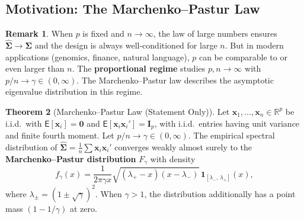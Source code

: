 \documentclass[12pt,a4paper]{article}
\theoremstyle{definition}
\newtheorem{theorem}{Theorem}[section]
\newtheorem{remark}[theorem]{Remark}
\newcommand\expc{\mathsf{E}}
\newcommand{\bx}{\mathbf{x}}
\newcommand{\bI}{\mathbf{I}}
\newcommand{\bzero}{\mathbf{0}}
\newcommand{\Real}{\mathbb{R}}
\newcommand{\bSigma}{\boldsymbol{\Sigma}}
\newcommand{\hbSigma}{\hat{\boldsymbol{\Sigma}}}
\begin{document}
\subsection{Motivation: The Marchenko--Pastur Law}

\begin{remark}
When $p$ is fixed and $n \to \infty$, the law of large numbers ensures $\hbSigma \to \bSigma$ and the design is always well-conditioned for large $n$. But in modern applications (genomics, finance, natural language), $p$ can be comparable to or even larger than $n$. The \textbf{proportional regime} studies $p, n \to \infty$ with $p/n \to \gamma \in (0, \infty)$. The Marchenko--Pastur law describes the asymptotic eigenvalue distribution in this regime.
\end{remark}

\begin{theorem}[Marchenko--Pastur Law (Statement Only)]\label{thm:marchenko-pastur}
Let $\bx_1, \ldots, \bx_n \in \Real^p$ be i.i.d.\ with $\expc[\bx_i] = \bzero$ and $\expc[\bx_i\bx_i'] = \bI_p$, with i.i.d.\ entries having unit variance and finite fourth moment. Let $p/n \to \gamma \in (0, \infty)$. The empirical spectral distribution of $\hbSigma = \frac{1}{n}\sum \bx_i\bx_i'$ converges weakly almost surely to the \textbf{Marchenko--Pastur distribution} $F_\gamma$ with density
\begin{equation}\label{eq:mp-density}
f_\gamma(x) = \frac{1}{2\pi\gamma x}\sqrt{(\lambda_+ - x)(x - \lambda_-)}\,\mathbf{1}_{[\lambda_-,\,\lambda_+]}(x),
\end{equation}
where $\lambda_\pm = (1 \pm \sqrt\gamma)^2$. When $\gamma > 1$, the distribution additionally has a point mass $(1 - 1/\gamma)$ at zero.
\end{theorem}
\end{document}
